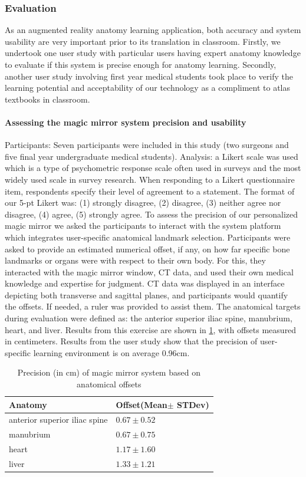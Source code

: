 \subsubsection{Evaluation}
As an augmented reality anatomy learning application, both accuracy and system usability are very important prior to its translation in classroom. Firstly, we undertook one user study with particular users having expert anatomy knowledge to evaluate if this system is precise enough for anatomy learning. Secondly, another user study involving first year medical students took place to verify the learning potential and acceptability of our technology as a compliment to atlas textbooks in classroom.

\paragraph{Assessing the magic mirror system precision and usability}
Participants: Seven participants were included in this study (two surgeons and five final year undergraduate medical students). 
Analysis: a Likert scale was used which is a type of psychometric response scale often used in surveys and the most widely used scale in survey research. When responding to a Likert questionnaire item, respondents specify their level of agreement to a statement. The format of our 5-pt Likert was: (1) strongly disagree, (2) disagree, (3) neither agree nor disagree, (4) agree, (5) strongly agree. 
To assess the precision of our personalized magic mirror we asked the participants to interact with the system platform which integrates user-specific anatomical landmark selection. Participants were asked to provide an estimated numerical offset, if any, on how far specific bone landmarks or organs were with respect to their own body. For this, they interacted with the magic mirror window, CT data, and used their own medical knowledge and expertise for judgment. CT data was displayed in an interface depicting both transverse and sagittal planes, and participants would quantify the offsets. If needed, a ruler was provided to assist them. The anatomical targets during evaluation were defined as: the anterior superior iliac spine, manubrium, heart, and liver. Results from this exercise are shown in \tablename{\ref{tb:3-PRMM:results1}}, with offsets measured in centimeters. Results from the user study show that the precision of user-specific learning environment is on average 0.96cm.
\begin{table}
	\caption{Precision (in cm) of magic mirror system based on anatomical offsets}
	\label{tb:3-PRMM:results1}
	\scriptsize
	\begin{center}
		\begin{tabular}{p{4cm}|p{3cm}}
			Anatomy & Offset(Mean$\pm$ STDev) \\
			\hline
			anterior superior iliac spine & $0.67\pm0.52$\\
			manubrium & $0.67\pm0.75$ \\
			heart & $1.17\pm1.60$\\
			liver & $1.33\pm1.21$
		\end{tabular}
	\end{center}
\end{table}

